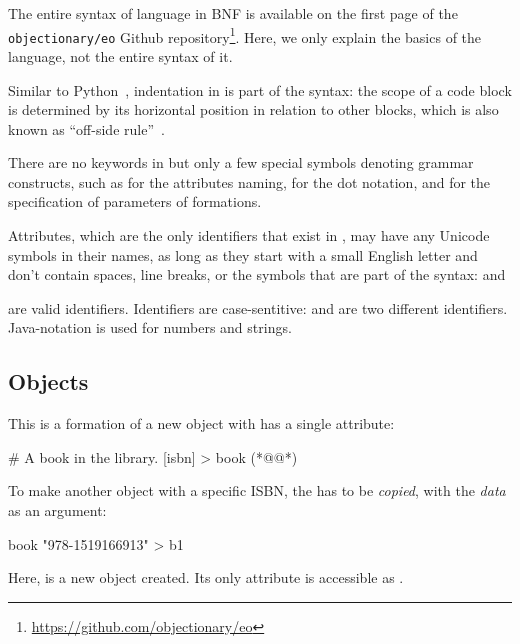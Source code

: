 
The entire syntax of \eolang{} language in BNF is available on the first page of the
\texttt{objectionary/eo} Github repository\footnote{\url{https://github.com/objectionary/eo}}.
Here, we only explain the basics of the language, not the entire syntax of it.

Similar to Python~\citep{lutz2013learning}, indentation in \eolang{} is part of the syntax:
the scope of a code block is determined by its horizontal position
in relation to other blocks, which is also known as ``off-side rule''~\citep{landin1966next}.

There are no keywords in \eolang{} but only a few special symbols
denoting grammar constructs, such as \ff{>} for the attributes naming,
 for the dot notation, and \ff{[]} for the specification of parameters of formations.

Attributes, which are the only identifiers that exist in \eolang{}, may have
any Unicode symbols in their names, as long as they start with a small English letter
and don't contain spaces, line breaks, or the symbols that are part of the syntax:
 and
\begin{CJK}{UTF8}{gbsn}
\end{CJK}
 are valid identifiers.
Identifiers are case-sentitive:  and  are two different identifiers.
Java-notation is used for numbers and strings.

\subsection{Objects}

This is a formation of a new object 
with has a single  attribute:

\begin{ffcode}
# A book in the library.
[isbn] > book (*@\label{ln:book}@*)
\end{ffcode}

To make another object with a specific ISBN, the 
has to be \emph{copied}, with the \emph{data} as an argument:

\begin{ffcode}
book "978-1519166913" > b1
\end{ffcode}

Here,  is a new object created.
Its only attribute is accessible as .

